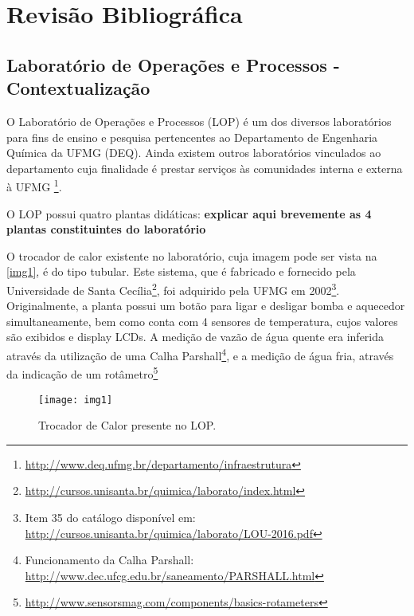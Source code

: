 \chapter{Revisão Bibliográfica}
	
	\section{Laboratório de Operações e Processos - Contextualização}
		O Laboratório de Operações e Processos (LOP) é um dos diversos laboratórios para fins de ensino e pesquisa pertencentes ao Departamento de Engenharia Química da UFMG (DEQ). Ainda existem outros laboratórios vinculados ao departamento cuja finalidade é prestar serviços às comunidades interna e externa à UFMG \footnote{\url{http://www.deq.ufmg.br/departamento/infraestrutura}}.
		
		O LOP possui quatro plantas didáticas: \textbf{explicar aqui brevemente as 4 plantas constituintes do laboratório}
		
		O trocador de calor existente no laboratório, cuja imagem pode ser vista na \autoref{img1}, é do tipo tubular. Este sistema, que é fabricado e fornecido pela Universidade de Santa Cecília\footnote{\url{http://cursos.unisanta.br/quimica/laborato/index.html}}, foi adquirido pela UFMG em 2002\footnote{Item 35 do catálogo disponível em: \url{http://cursos.unisanta.br/quimica/laborato/LOU-2016.pdf}}. Originalmente, a planta possui um botão para ligar e desligar bomba e aquecedor simultaneamente, bem como conta com 4 sensores de temperatura, cujos valores são exibidos e display LCDs. A medição de vazão de água quente era inferida através da utilização de uma Calha Parshall\footnote{Funcionamento da Calha Parshall: \url{http://www.dec.ufcg.edu.br/saneamento/PARSHALL.html}}, e a medição de água fria, através da indicação de um rotâmetro\footnote{\url{http://www.sensorsmag.com/components/basics-rotameters}}
		
		\begin{figure}[!htb]
			\centering
			\texttt{[image: img1]}  %
			\caption{Trocador de Calor presente no LOP.}
			\label{img1}
		\end{figure}

